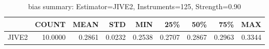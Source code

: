 \begin{table}[ht]
\centering
\caption{bias summary: Estimator=JIVE2, Instruments=125, Strength=0.90}
\begin{tabular}{lrrrrrrrr}
\toprule
 & COUNT & MEAN & STD & MIN & 25\% & 50\% & 75\% & MAX \\
\midrule
JIVE2 & 10.0000 & 0.2861 & 0.0232 & 0.2538 & 0.2707 & 0.2867 & 0.2963 & 0.3344 \\
\bottomrule
\end{tabular}
\end{table}
